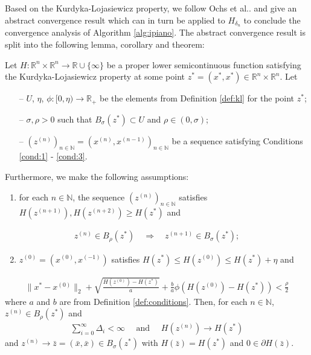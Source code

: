 \documentclass[onecolumn,final,a4paper,13pt,reqno]{siamart}
\makeatletter
\DeclareRobustCommand\onedot{\futurelet\@let@token\@onedot}
\def\@onedot{\ifx\@let@token.\else.\null\fi\xspace}
\def\etal{{et al}\onedot}
\makeatother
\begin{document}
Based on the Kurdyka-Lojasiewicz property, we follow Ochs \etal and give an abstract convergence result which can in turn be applied to $H_{\delta_n}$ to conclude the convergence analysis of Algorithm \ref{alg:ipiano}. The abstract convergence result is split into the following lemma, corollary and theorem:

\begin{lemmamd}
	Let $H : \mathbb{R}^n \times \mathbb{R}^n \rightarrow \mathbb{R} \cup \{\infty\}$ be a proper lower semicontinuous function satisfying the Kurdyka-Lojasiewicz property at some point $z^\ast = (x^\ast, x^\ast) \in \mathbb{R}^n \times \mathbb{R}^n$. Let
	\begin{itemize}
		\item[--] $U$, $\eta$, $\phi : [0, \eta) \rightarrow \mathbb{R}_+$  be the elements from Definition \ref{def:kl} for the point $z^\ast$;
		\item[--] $\sigma, \rho > 0$ such that $B_\sigma(z^\ast) \subset U$ and $\rho \in (0, \sigma)$;
		\item[--] $(z^{(n)})_{n \in \mathbb{N}} = (x^{(n)}, x^{(n - 1)})_{n \in \mathbb{N}}$ be a sequence satisfying Conditions \ref{cond:1} - \ref{cond:3}.
	\end{itemize}
	Furthermore, we make the following assumptions:
	\begin{enumerate}[label=(A\arabic*)]
		\item for each $n \in \mathbb{N}$, the sequence $(z^{(n)})_{n \in \mathbb{N}}$ satisfies $H(z^{(n + 1)}), H(z^{(n + 2)}) \geq H(z^\ast)$ and\label{ass:1}
	\end{enumerate}
	\begin{align}
		z^{(n)} \in B_\rho(z^\ast) \quad \Rightarrow \quad z^{(n + 1)} \in B_\sigma(z^\ast);
	\end{align}
	\begin{enumerate}[label=(A\arabic*)]
		\setcounter{enumi}{1}
		\item $z^{(0)} = (x^{(0)}, x^{(-1)})$ satisfies $H(z^\ast) \leq H(z^{(0)}) \leq H(z^\ast) + \eta$ and\label{ass:2}
	\end{enumerate}
	\begin{align}
		\|x^\ast - x^{(0)}\|_2 + \sqrt{\frac{H(z^{(0)}) - H(z^\ast)}{a}} + \frac{b}{a} \phi(H(z^{(0)}) - H(z^\ast)) < \frac{\rho}{2}
	\end{align}
	where $a$ and $b$ are from Definition \ref{def:conditions}. Then, for each $n \in \mathbb{N}$, $z^{(n)} \in B_\rho(z^\ast)$ and
	\begin{align}
		\sum_{i = 0}^\infty \Delta_i < \infty\quad\text{ and }\quad H(z^{(n)}) \rightarrow H(z^\ast)
	\end{align}
	and $z^{(n)} \rightarrow \bar{z} = (\bar{x}, \bar{x}) \in B_\sigma(z^\ast)$ with $H(\bar{z}) = H(z^\ast)$ and $0 \in \partial H(\bar{z})$.\label{lemma:lemma}
\end{lemmamd}
\end{document}
